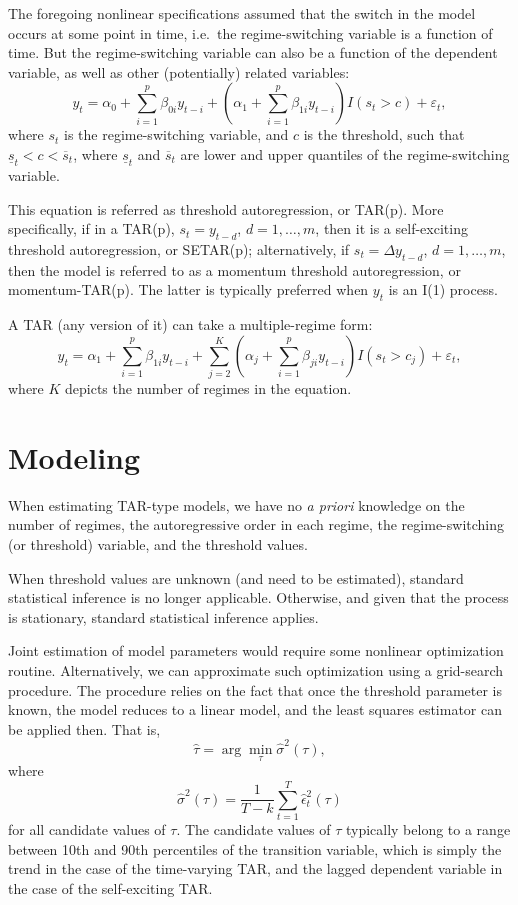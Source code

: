 \documentclass[
  oneside]{book}
\begin{document}
The foregoing nonlinear specifications assumed that the switch in the model occurs at some point in time, i.e.~the regime-switching variable is a function of time. But the regime-switching variable can also be a function of the dependent variable, as well as other (potentially) related variables: \[y_t = \alpha_0 + \sum_{i=1}^{p}\beta_{0i} y_{t-i} + \left(\alpha_1 + \sum_{i=1}^{p}\beta_{1i} y_{t-i}\right)I(s_t>c) + \varepsilon_t,\] where \(s_t\) is the regime-switching variable, and \(c\) is the threshold, such that \(\underline{s}_t < c < \overline{s}_t\), where \(\underline{s}_t\) and \(\overline{s}_t\) are lower and upper quantiles of the regime-switching variable.

This equation is referred as threshold autoregression, or TAR(p). More specifically, if in a TAR(p), \(s_t = y_{t-d}\), \(d = 1,\ldots,m\), then it is a self-exciting threshold autoregression, or SETAR(p); alternatively, if \(s_t = \Delta y_{t-d}\), \(d = 1,\ldots,m\), then the model is referred to as a momentum threshold autoregression, or momentum-TAR(p). The latter is typically preferred when \(y_t\) is an I(1) process.

A TAR (any version of it) can take a multiple-regime form: \[y_t = \alpha_1 + \sum_{i=1}^{p}\beta_{1i} y_{t-i} + \sum_{j=2}^{K}{\left(\alpha_j + \sum_{i=1}^{p}\beta_{ji} y_{t-i}\right)I(s_t>c_j)} + \varepsilon_t,\] where \(K\) depicts the number of regimes in the equation.

\hypertarget{modeling-4}{%
\section{Modeling}\label{modeling-4}}

When estimating TAR-type models, we have no \emph{a priori} knowledge on the number of regimes, the autoregressive order in each regime, the regime-switching (or threshold) variable, and the threshold values.

When threshold values are unknown (and need to be estimated), standard statistical inference is no longer applicable. Otherwise, and given that the process is stationary, standard statistical inference applies.

Joint estimation of model parameters would require some nonlinear optimization routine. Alternatively, we can approximate such optimization using a grid-search procedure. The procedure relies on the fact that once the threshold parameter is known, the model reduces to a linear model, and the least squares estimator can be applied then. That is, \[\hat{\tau} = \arg\min_{\tau}\hat{\sigma}^2(\tau),\] where \[\hat{\sigma}^2(\tau) = \frac{1}{T-k}\sum_{t=1}^{T}\hat{\epsilon}_t^2(\tau)\] for all candidate values of \(\tau\). The candidate values of \(\tau\) typically belong to a range between 10th and 90th percentiles of the transition variable, which is simply the trend in the case of the time-varying TAR, and the lagged dependent variable in the case of the self-exciting TAR.
\end{document}
